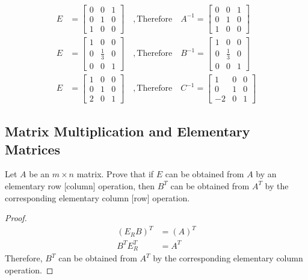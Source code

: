 \documentclass[10pt, oneside]{article}
\begin{document}
\[
	\begin{split}
		E &= \begin{bmatrix} 0 & 0 & 1 \\ 0 & 1 & 0 \\ 1 & 0 & 0 \end{bmatrix} \quad , \text{Therefore} \quad A^{-1} = \begin{bmatrix} 0 & 0 & 1 \\ 0 & 1 & 0 \\ 1 & 0 & 0 \end{bmatrix} \\
		E &= \begin{bmatrix} 1 & 0 & 0 \\ 0 & \frac{1}{3} & 0 \\ 0 & 0 & 1 \end{bmatrix} \quad , \text{Therefore} \quad B^{-1} = \begin{bmatrix} 1 & 0 & 0 \\ 0 & \frac{1}{3} & 0 \\ 0 & 0 & 1 \end{bmatrix} \\
		E &= \begin{bmatrix} 1 & 0 & 0 \\ 0 & 1 & 0 \\ 2 & 0 & 1 \end{bmatrix} \quad , \text{Therefore} \quad C^{-1} = \begin{bmatrix} 1 & 0 & 0 \\ 0 & 1 & 0 \\ -2 & 0 & 1 \end{bmatrix}
	\end{split}
\]

\subsection{Matrix Multiplication and Elementary Matrices}

Let $A$ be an $m \times n$ matrix. Prove that if $E$ can be obtained from $A$ by an elementary row [column] operation, then $B^T$ can be obtained from $A^T$ by the corresponding elementary column [row] operation.

\begin{proof}
	\begin{align*}
		(E_RB)^T & = (A)^T \\
		B^TE_R^T & = A^T
	\end{align*}
	Therefore, $B^T$ can be obtained from $A^T$ by the corresponding elementary column operation.
\end{proof}
\end{document}
